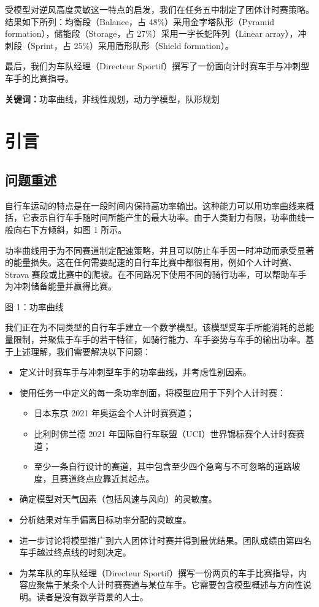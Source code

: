 \documentclass[11pt,a4paper]{ctexart}
\begin{document}
受模型对逆风高度灵敏这一特点的启发，我们在任务五中制定了团体计时赛策略。结果如下所列：均衡段（Balance，占 48\%）采用金字塔队形（Pyramid formation），储能段（Storage，占 27\%）采用一字长蛇阵列（Linear array），冲刺段（Sprint，占 25\%）采用盾形队形（Shield formation）。

最后，我们为车队经理（Directeur Sportif）撰写了一份面向计时赛车手与冲刺型车手的比赛指导。

\vspace{6pt}
\noindent\textbf{关键词：}功率曲线，非线性规划，动力学模型，队形规划

\newpage
\pagestyle{fancy}

\section{引言}

\subsection{问题重述}

自行车运动的特点是在一段时间内保持高功率输出。这种能力可以用功率曲线来概括，它表示自行车手随时间所能产生的最大功率。由于人类耐力有限，功率曲线一般向右下方倾斜，如图 1 所示。

功率曲线用于为不同赛道制定配速策略，并且可以防止车手因一时冲动而承受显著的能量损失。这在任何需要配速的自行车比赛中都很有用，例如个人计时赛、Strava 赛段或比赛中的爬坡。在不同路况下使用不同的骑行功率，可以帮助车手为冲刺储备能量并赢得比赛。

图 1：功率曲线

我们正在为不同类型的自行车手建立一个数学模型。该模型受车手所能消耗的总能量限制，并聚焦于车手的若干特征，如骑行能力、车手姿势与车手的输出功率。基于上述理解，我们需要解决以下问题：

\begin{itemize}
\item 定义计时赛车手与冲刺型车手的功率曲线，并考虑性别因素。
\item 使用任务一中定义的每一条功率剖面，将模型应用于下列个人计时赛：
  \begin{itemize}
  \item 日本东京 2021 年奥运会个人计时赛赛道；
  \item 比利时佛兰德 2021 年国际自行车联盟（UCI）世界锦标赛个人计时赛赛道；
  \item 至少一条自行设计的赛道，其中包含至少四个急弯与不可忽略的道路坡度，且赛道终点应靠近其起点。
  \end{itemize}
\item 确定模型对天气因素（包括风速与风向）的灵敏度。
\item 分析结果对车手偏离目标功率分配的灵敏度。
\item 进一步讨论将模型推广到六人团体计时赛并得到最优结果。团队成绩由第四名车手越过终点线的时刻决定。
\item 为某车队的车队经理（Directeur Sportif）撰写一份两页的车手比赛指导，内容应聚焦于某条个人计时赛赛道与某位车手。它需要包含模型概述与方向性说明。读者是没有数学背景的人士。
\end{itemize}
\end{document}
